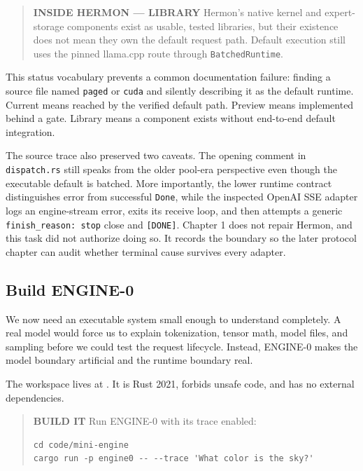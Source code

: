 \documentclass[
  10pt,
]{article}
\begin{document}
\begin{quote}
\textbf{INSIDE HERMON --- LIBRARY} Hermon's native kernel and
expert-storage components exist as usable, tested libraries, but their
existence does not mean they own the default request path. Default
execution still uses the pinned llama.cpp route through
\texttt{BatchedRuntime}.
\end{quote}

This status vocabulary prevents a common documentation failure: finding
a source file named \texttt{paged} or \texttt{cuda} and silently
describing it as the default runtime. Current means reached by the
verified default path. Preview means implemented behind a gate. Library
means a component exists without end-to-end default integration.

The source trace also preserved two caveats. The opening comment in
\texttt{dispatch.rs} still speaks from the older pool-era perspective
even though the executable default is batched. More importantly, the
lower runtime contract distinguishes error from successful
\texttt{Done}, while the inspected OpenAI SSE adapter logs an
engine-stream error, exits its receive loop, and then attempts a generic
\texttt{finish\_reason:\ stop} close and \texttt{{[}DONE{]}}. Chapter 1
does not repair Hermon, and this task did not authorize doing so. It
records the boundary so the later protocol chapter can audit whether
terminal cause survives every adapter.

\subsection{Build ENGINE-0}\label{build-engine-0}

We now need an executable system small enough to understand completely.
A real model would force us to explain tokenization, tensor math, model
files, and sampling before we could test the request lifecycle. Instead,
ENGINE-0 makes the model boundary artificial and the runtime boundary
real.

The workspace lives at
\href{https://github.com/hermonai/inside-the-llm-engine/blob/astra-visual-rewrite/code/mini-engine/README.md}{\texttt{}}.
It is Rust 2021, forbids unsafe code, and has no external dependencies.

\begin{quote}
\textbf{BUILD IT} Run ENGINE-0 with its trace enabled:

\begin{verbatim}
cd code/mini-engine
cargo run -p engine0 -- --trace 'What color is the sky?'
\end{verbatim}
\end{quote}
\end{document}
